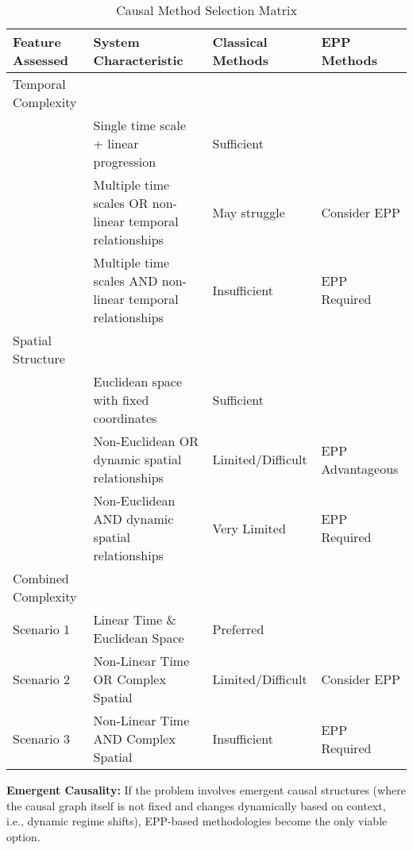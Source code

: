 \begin{table}[hb]
\begin{tabular}{llll}
Feature Assessed &
  System Characteristic &
  Classical Methods &
  EPP Methods \\ \hline
\multicolumn{1}{|l|}{Temporal Complexity} &
  \multicolumn{1}{l|}{} &
  \multicolumn{1}{l|}{} &
  \multicolumn{1}{l|}{} \\ \hline
\multicolumn{1}{|l|}{} &
  \multicolumn{1}{l|}{Single time scale + linear progression} &
  \multicolumn{1}{l|}{Sufficient} &
  \multicolumn{1}{l|}{} \\ \hline
\multicolumn{1}{|l|}{} &
  \multicolumn{1}{l|}{Multiple time scales OR non-linear temporal relationships} &
  \multicolumn{1}{l|}{May struggle} &
  \multicolumn{1}{l|}{Consider EPP} \\ \hline
\multicolumn{1}{|l|}{} &
  \multicolumn{1}{l|}{Multiple time scales AND non-linear temporal relationships} &
  \multicolumn{1}{l|}{Insufficient} &
  \multicolumn{1}{l|}{EPP Required} \\ \hline
\multicolumn{1}{|l|}{Spatial Structure} &
  \multicolumn{1}{l|}{} &
  \multicolumn{1}{l|}{} &
  \multicolumn{1}{l|}{} \\ \hline
\multicolumn{1}{|l|}{} &
  \multicolumn{1}{l|}{Euclidean space with fixed coordinates} &
  \multicolumn{1}{l|}{Sufficient} &
  \multicolumn{1}{l|}{} \\ \hline
\multicolumn{1}{|l|}{} &
  \multicolumn{1}{l|}{Non-Euclidean OR dynamic spatial relationships} &
  \multicolumn{1}{l|}{Limited/Difficult} &
  \multicolumn{1}{l|}{EPP Advantageous} \\ \hline
\multicolumn{1}{|l|}{} &
  \multicolumn{1}{l|}{Non-Euclidean AND dynamic spatial relationships} &
  \multicolumn{1}{l|}{Very Limited} &
  \multicolumn{1}{l|}{EPP Required} \\ \hline
\multicolumn{1}{|l|}{Combined Complexity} &
  \multicolumn{1}{l|}{} &
  \multicolumn{1}{l|}{} &
  \multicolumn{1}{l|}{} \\ \hline
\multicolumn{1}{|l|}{Scenario 1} &
  \multicolumn{1}{l|}{Linear Time \& Euclidean Space} &
  \multicolumn{1}{l|}{Preferred} &
  \multicolumn{1}{l|}{} \\ \hline
\multicolumn{1}{|l|}{Scenario 2} &
  \multicolumn{1}{l|}{Non-Linear Time OR Complex Spatial} &
  \multicolumn{1}{l|}{Limited/Difficult} &
  \multicolumn{1}{l|}{Consider EPP} \\ \hline
\multicolumn{1}{|l|}{Scenario 3} &
  \multicolumn{1}{l|}{Non-Linear Time AND Complex Spatial} &
  \multicolumn{1}{l|}{Insufficient} &
  \multicolumn{1}{l|}{EPP Required} \\ \hline
\end{tabular}
\caption{Causal Method Selection Matrix}
\label{tab:method_matrix}
\end{table}

\textbf{Emergent Causality:} If the problem involves emergent causal structures (where the causal graph itself is not fixed and changes dynamically based on context, i.e., dynamic regime shifts), EPP-based methodologies become the only viable option.


\newpage